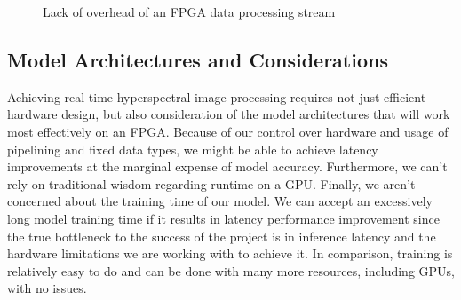 \documentclass{article}
\begin{document}
\begin{figure}[ht]
\centering
{}
\caption{Lack of overhead of an FPGA data processing stream}
\label{fig:fpgadiagram}
\end{figure}


\subsection{Model Architectures and Considerations}
Achieving real time hyperspectral image processing requires not just efficient hardware design, but also consideration of the model architectures that will work most effectively on an FPGA. Because of our control over hardware and usage of pipelining and fixed data types, we might be able to achieve latency improvements at the marginal expense of model accuracy. Furthermore, we can't rely on traditional wisdom regarding runtime on a GPU. Finally, we aren't concerned about the training time of our model. We can accept an excessively long model training time if it results in latency performance improvement since the true bottleneck to the success of the project is in inference latency and the hardware limitations we are working with to achieve it. In comparison, training is relatively easy to do and can be done with many more resources, including GPUs, with no issues.
\end{document}
